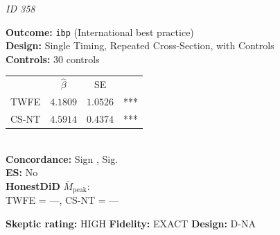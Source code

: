 \begin{tcolorbox}[
  colback=white, colframe=black!60, boxrule=0.4pt,
  arc=2pt, left=4pt, right=4pt, top=3pt, bottom=3pt]
  \footnotesize
  \textbf{\textcite{bargain2019women}} \hfill \textit{ID 358}\\[2pt]
  
  \begin{minipage}[t]{0.45\textwidth}
    \textbf{Outcome:} \texttt{ibp} (International best practice)\\
    \textbf{Design:} Single Timing, Repeated Cross-Section, with Controls\\
    \textbf{Controls:} 30 controls\\
  \end{minipage}\hfill
  \begin{minipage}[t]{0.45\textwidth}
    \begin{tabular}{@{}lccc@{}}
      & $\hat{\beta}$ & SE & \\
      TWFE & $4.1809$ & $1.0526$ & *** \\
      CS-NT & $4.5914$ & $0.4374$ & *** \\
    \end{tabular}\\[3pt]
    \textbf{Concordance:} Sign \checkmark, Sig. \checkmark\\
    \textbf{ES:} No\\
    \textbf{HonestDiD} $\bar{M}_{\text{peak}}$:\\
    TWFE = ---, CS-NT = ---
  \end{minipage}
  \tcbline
  \textbf{Skeptic rating:} HIGH \hfill \textbf{Fidelity:} EXACT \hfill \textbf{Design:} D-NA
\end{tcolorbox}
\vspace{6pt}

